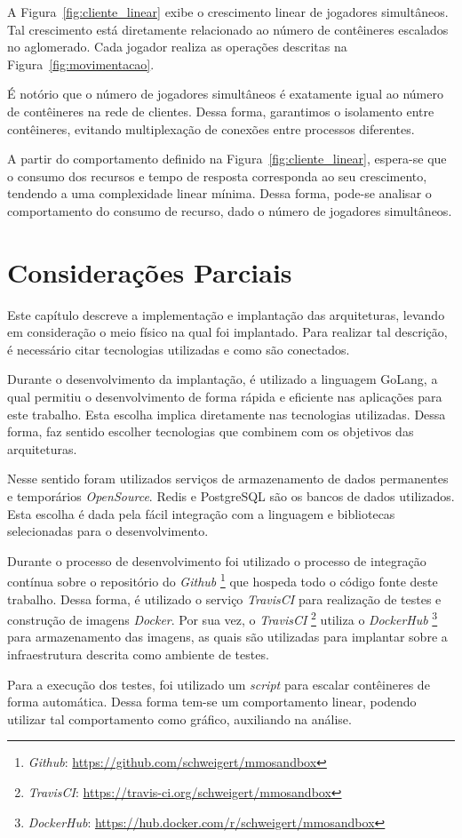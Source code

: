 A Figura~\ref{fig:cliente_linear} exibe o crescimento linear de jogadores simultâneos.
%
Tal crescimento está diretamente relacionado ao número de contêineres escalados no aglomerado.
%
Cada jogador realiza as operações descritas na Figura~\ref{fig:movimentacao}.

É notório que o número de jogadores simultâneos é exatamente igual ao número de contêineres na rede de clientes.
%
Dessa forma, garantimos o isolamento entre contêineres, evitando multiplexação de conexões entre processos diferentes.


A partir do comportamento definido na Figura~\ref{fig:cliente_linear}, espera-se que o consumo dos recursos e tempo de resposta corresponda ao seu crescimento, tendendo a uma complexidade linear mínima.
%
Dessa forma, pode-se analisar o comportamento do consumo de recurso, dado o número de jogadores simultâneos.


\section{Considerações Parciais}

Este capítulo descreve a implementação e implantação das arquiteturas, levando em consideração o meio físico na qual foi implantado.
%
Para realizar tal descrição, é necessário citar tecnologias utilizadas e como são conectados.

Durante o desenvolvimento da implantação, é utilizado a linguagem GoLang, a qual permitiu o desenvolvimento de forma rápida e eficiente nas aplicações para este trabalho.
%
Esta escolha implica diretamente nas tecnologias utilizadas.
%
Dessa forma, faz sentido escolher tecnologias que combinem com os objetivos das arquiteturas.

Nesse sentido foram utilizados serviços de armazenamento de dados permanentes e temporários \textit{OpenSource}.
%
Redis e PostgreSQL são os bancos de dados utilizados.
%
Esta escolha é dada pela fácil integração com a linguagem e bibliotecas selecionadas para o desenvolvimento.

Durante o processo de desenvolvimento foi utilizado o processo de integração contínua sobre o repositório do \textit{Github}
%
\footnote{\textit{Github}: \url{https://github.com/schweigert/mmosandbox}}
%
que hospeda todo o código fonte deste trabalho.
%
Dessa forma, é utilizado o serviço \textit{TravisCI} para realização de testes e construção de imagens \textit{Docker}.
%
Por sua vez, o \textit{TravisCI}
%
\footnote{\textit{TravisCI}: \url{https://travis-ci.org/schweigert/mmosandbox}}
%
utiliza o \textit{DockerHub}
%
\footnote{\textit{DockerHub}: \url{https://hub.docker.com/r/schweigert/mmosandbox}}
%
para armazenamento das imagens, as quais são utilizadas para implantar sobre a infraestrutura descrita como ambiente de testes.

Para a execução dos testes, foi utilizado um \textit{script} para escalar contêineres de forma automática.
%
Dessa forma tem-se um comportamento linear, podendo utilizar tal comportamento como gráfico, auxiliando na análise.
